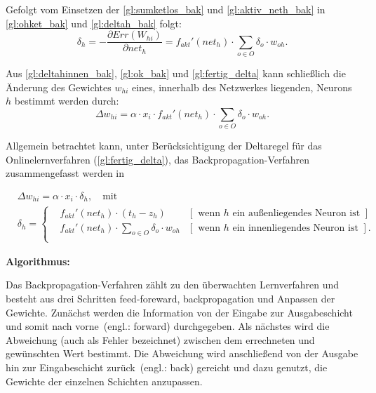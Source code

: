 Gefolgt vom Einsetzen der \autoref{gl:sumketlos_bak} und \autoref{gl:aktiv_neth_bak} in \autoref{gl:ohket_bak} und \autoref{gl:deltah_bak} folgt:
\begin{equation}
\delta_{h}= -\frac{\partial Err(W_{hi})}{\partial net_{h}} = f_{akt}'(net_h) \cdot \sum\limits_{o \in O}  \delta_o \cdot w_{oh}.
\label{gl:deltahinnen_bak}
\end{equation}

Aus \autoref{gl:deltahinnen_bak}, \autoref{gl:ok_bak} und \autoref{gl:fertig_delta} kann schließlich die Änderung des Gewichtes $w_{hi}$ eines, innerhalb des Netzwerkes liegenden, Neurons $h$ bestimmt werden durch:
\begin{equation}
\Delta w_{hi} = \alpha \cdot x_{i} \cdot f_{akt}'(net_h) \cdot \sum\limits_{o \in O}  \delta_o \cdot w_{oh}  .
\label{gl:fertiginnen_bak}
\end{equation}

Allgemein betrachtet kann, unter Berücksichtigung der Deltaregel für das Onlinelernverfahren (\autoref{gl:fertig_delta}), das Backpropagation-Verfahren zusammengefasst werden in\,

\begin{align}
\nonumber & \Delta w_{hi}  = \alpha \cdot x_{i} \cdot \delta_h, \quad \text{mit}\\
&\delta_h = \left \{
\begin{aligned}
&f_{akt}'(net_h) \cdot (t_h - z_h) &[\text{ wenn }  h \text{ ein au\ss enliegendes Neuron ist }]\\ 
&f_{akt}'(net_h) \cdot \sum\limits_{o \in O}  \delta_o \cdot w_{oh} &[\text{ wenn }  h \text{ ein innenliegendes Neuron ist }].\\
\end{aligned}
\right.
\label{gl:fertigbeide_bak}
\end{align}

\textbf{Algorithmus:}\,

Das Backpropagation-Verfahren zählt zu den überwachten Lernverfahren und besteht aus drei Schritten feed-foreward, backpropagation und Anpassen der Gewichte. Zunächst werden die Information von der Eingabe zur Ausgabeschicht und somit nach \glqq vorne\grqq~(engl.: forward) durchgegeben. Als nächstes wird die Abweichung (auch als Fehler bezeichnet) zwischen dem errechneten und gewünschten Wert bestimmt. Die Abweichung wird anschließend von der Ausgabe hin zur Eingabeschicht \glqq zurück\grqq~(engl.: back) gereicht und dazu genutzt, die Gewichte der einzelnen Schichten anzupassen.

